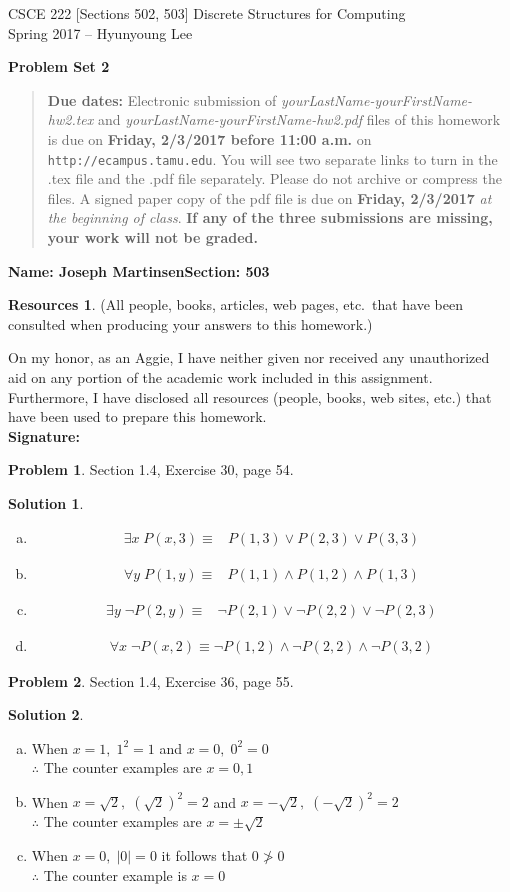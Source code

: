\documentclass{article}
\theoremstyle{definition}
\newtheorem{problem}{Problem}
\newtheorem*{solution}{Solution}
\newtheorem*{resources}{Resources}
\newcommand{\name}[2]{\noindent\textbf{Name: #1}\hfill \textbf{Section: #2}}
\newcommand{\honor}{\noindent On my honor, as an Aggie, I have neither
  given nor received any unauthorized aid on any portion of the
  academic work included in this assignment. Furthermore, I have
  disclosed all resources (people, books, web sites, etc.) that have
  been used to prepare this homework. \\[2ex]
 \textbf{Signature:} \underline{\hspace*{10cm}} }
\newcommand{\problemset}[1]{\begin{center}\textbf{Problem Set #1}\end{center}}
\newcommand{\duedate}[2]{\begin{quote}\textbf{Due dates:} Electronic
    submission of \textsl{yourLastName-yourFirstName-hw2.tex} and 
    \textsl{yourLastName-yourFirstName-hw2.pdf} files of this homework is due on
    \textbf{#1} on \texttt{http://ecampus.tamu.edu}. You will see two separate links
    to turn in the .tex file and the .pdf file separately. Please do not archive or compress the files.  
    A signed paper copy of the pdf file is due on \textbf{#2} \textsl{at the beginning of class}.
    \textbf{If any of the three submissions are missing, your work will not be graded.}\end{quote} }
\begin{document}
\vspace*{-15mm}
\begin{center}
{\large
CSCE 222 [Sections 502, 503] Discrete Structures for Computing\\[.5ex]
Spring 2017 -- Hyunyoung Lee\\}
\end{center}
\problemset{2}
\duedate{Friday, 2/3/2017 before 11:00 a.m.}{Friday, 2/3/2017}
\name{Joseph Martinsen}{503}
\begin{resources} (All people, books, articles, web pages, etc.\ that
  have been consulted when producing your answers to this homework.)
\end{resources}
\honor

\smallskip

\begin{problem} Section 1.4, Exercise 30, page 54. 
\end{problem}
\begin{solution}
\begin{enumerate}[a)]
  \ \\ $x \in \{1,2,3 \} \quad y \in \{1,2,3\}$
  \item
  \begin{align*}
    \exists x \; P(x,3) \equiv& P(1,3) \lor P(2,3) \lor P(3,3)
  \end{align*}
  
  \item
  \begin{align*}
    \forall y \; P(1,y) \equiv& P(1,1) \land P(1,2) \land P(1,3)
  \end{align*}
  \item
  \begin{align*}
    \exists y \; \neg P(2,y) \equiv& \neg P(2,1) \lor \neg P(2,2) \lor \neg P(2,3)
  \end{align*}
  \item
  \begin{align*}
    \forall x \; \neg P(x,2) \equiv \neg P(1,2) \land \neg P(2,2) \land \neg P(3,2)
  \end{align*}
\end{enumerate}
\end{solution}

\begin{problem} Section 1.4, Exercise 36, page 55.
\end{problem}
\begin{solution}
\begin{enumerate}[a)] \ \\
  \item When $x=1, \; 1^2 = 1$ and $x=0, \; 0^2 = 0$ \\
        $\therefore$ The counter examples are $x=0,1$
  \item When $x=\sqrt{2}, \; (\sqrt{2})^2 = 2$ and $x=-\sqrt{2}, \; (-\sqrt{2})^2 = 2$ \\
        $\therefore$ The counter examples are $x=\pm \sqrt{2}$
  \item When $x=0, \; |0| = 0$ it follows that $0 \ngtr 0$ \\
        $\therefore$ The counter example is $x=0$
\end{enumerate}
\end{solution}
\end{document}
